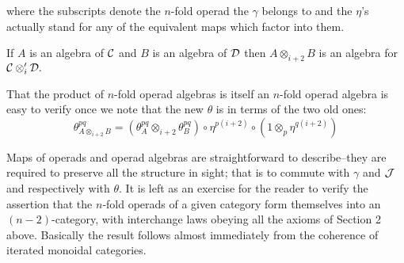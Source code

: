 \documentclass{tac}
\begin{document}
{where the subscripts denote the
$n$-fold operad the $\gamma$ belongs to and the $\eta$'s actually stand for any of 
the equivalent maps which factor into them. 


      
     If $A$ is an algebra of ${\cal C}$ and $B$ is an algebra of ${\cal D}$ then
           $A\otimes_{i+2} B$ is an algebra for ${\cal C}\otimes'_i{\cal D}.$
     
 That the product of $n$-fold operad algebras is itself an $n$-fold operad algebra is easy to verify once 
we note that the new $\theta$ is in terms of the two old ones: 
  $$
     \theta^{pq}_{A\otimes_{i+2} B} = 
     (\theta^{pq}_{A}\otimes_{i+2}\theta^{pq}_{B})\circ \eta^{p(i+2)} \circ (1 \otimes_p \eta^{q(i+2)})
$$
    
Maps of operads and operad algebras are straightforward to describe--they are required to 
preserve all the structure in sight; that is to commute with $\gamma$ and ${\cal J}$ and respectively 
with $\theta.$
It is left as an exercise for the reader to verify the assertion that the $n$-fold
operads of a given category form themselves into an $(n-2)$-category, with interchange laws obeying 
all the axioms of Section 2 above. Basically the result follows almost immediately from
the coherence of iterated monoidal categories.
 
      
      
      
      
      
      
      
       
        
}
\end{document}
